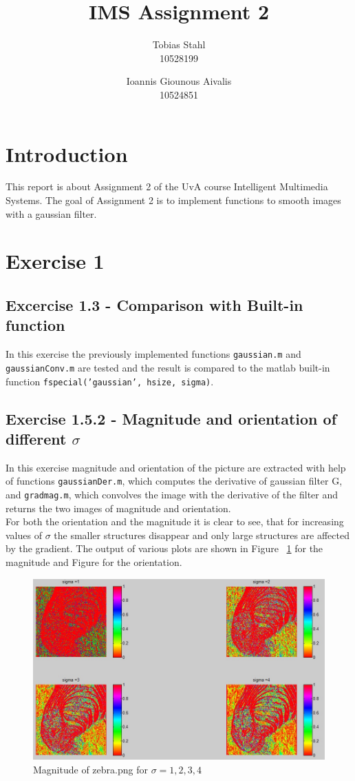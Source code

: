 \documentclass[11pt]{article}
\title{
	\textbf{IMS Assignment 2}
}
\author{Tobias Stahl \\ 10528199 \and Ioannis Giounous Aivalis \\ 10524851 }
\begin{document}
\maketitle


\section{Introduction}
This report is about Assignment 2 of the UvA course Intelligent Multimedia Systems. The goal of Assignment 2 is to implement functions to smooth images with a gaussian filter.\\

\section{Exercise 1}

\subsection{Excercise 1.3 - Comparison with Built-in function}
In this exercise the previously implemented functions \texttt{gaussian.m} and \texttt{gaussianConv.m} are tested and the result is compared to the matlab built-in function \texttt{fspecial('gaussian', hsize, sigma)}.

\subsection{Exercise 1.5.2 - Magnitude and orientation of different $\sigma$}
In this exercise magnitude and orientation of the picture are extracted with help of functions \texttt{gaussianDer.m}, which computes the derivative of gaussian filter G, and \texttt{gradmag.m}, which convolves the image with the derivative of the filter and returns the two images of magnitude and orientation.\\
For both the orientation and the magnitude it is clear to see, that for increasing values of $\sigma$ the smaller structures disappear and only large structures are affected by the gradient. The output of various plots are shown in Figure ~\ref{magnitude} for the magnitude and Figure for the orientation.
\begin{figure}[h!]
\includegraphics[scale=0.6]{Magnitude.jpg}
\caption{Magnitude of zebra.png for $\sigma = {1,2,3,4}$}
\label{magnitude}
\end{figure}
\end{document}
